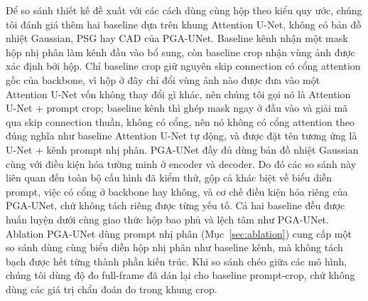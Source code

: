\documentclass[11pt]{article}
\begin{document}
Để so sánh thiết kế đề xuất với các cách dùng cùng hộp theo kiểu quy ước, chúng tôi đánh giá thêm hai baseline dựa trên khung Attention U-Net, không có bản đồ nhiệt Gaussian, PSG hay CAD của PGA-UNet. Baseline kênh nhận một mask hộp nhị phân làm kênh đầu vào bổ sung, còn baseline crop nhận vùng ảnh được xác định bởi hộp. Chỉ baseline crop giữ nguyên skip connection có cổng attention gốc của backbone, vì hộp ở đây chỉ đổi vùng ảnh nào được đưa vào một Attention U-Net vốn không thay đổi gì khác, nên chúng tôi gọi nó là Attention U-Net + prompt crop; baseline kênh thì ghép mask ngay ở đầu vào và giải mã qua skip connection thuần, không có cổng, nên nó không có cổng attention theo đúng nghĩa như baseline Attention U-Net tự động, và được đặt tên tương ứng là U-Net + kênh prompt nhị phân. PGA-UNet đầy đủ dùng bản đồ nhiệt Gaussian cùng với điều kiện hóa tường minh ở encoder và decoder. Do đó các so sánh này liên quan đến toàn bộ cấu hình đã kiểm thử, gộp cả khác biệt về biểu diễn prompt, việc có cổng ở backbone hay không, và cơ chế điều kiện hóa riêng của PGA-UNet, chứ không tách riêng được từng yếu tố. Cả hai baseline đều được huấn luyện dưới cùng giao thức hộp bao phủ và lệch tâm như PGA-UNet. Ablation PGA-UNet dùng prompt nhị phân (Mục~\ref{sec:ablation}) cung cấp một so sánh dùng cùng biểu diễn hộp nhị phân như baseline kênh, mà không tách bạch được hết từng thành phần kiến trúc. Khi so sánh chéo giữa các mô hình, chúng tôi dùng độ đo full-frame đã dán lại cho baseline prompt-crop, chứ không dùng các giá trị chẩn đoán đo trong khung crop.
\end{document}
